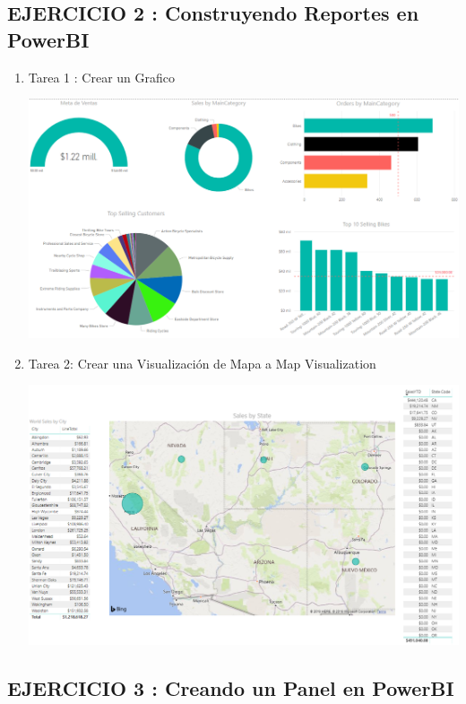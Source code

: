 \begin{itemize}
\subsection {EJERCICIO 2 : Construyendo Reportes en PowerBI}

\begin{enumerate}
\item Tarea 1 : Crear un Grafico

\begin{center}
\includegraphics[scale=0.66]{./Imagenes/ejer2_tarea1.png}
\end{center}

\item Tarea 2: Crear una Visualizaci\'on de Mapa a Map Visualization

\begin{center}
\includegraphics[scale=0.70]{./Imagenes/ejer2_tarea2.png}
\end{center}

\end{enumerate}


\subsection {EJERCICIO 3 : Creando un Panel en PowerBI}
\begin{enumerate}


\end{enumerate}
\end{itemize}
